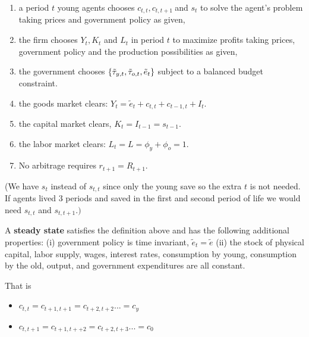 \documentclass{sebase}
\begin{document}
\begin{enumerate}
\item a period $t$ young agents chooses $c_{t,t},c_{t,t+1}\ $and $s_{t}$ to
solve the agent's problem taking prices and government policy as given,

\item the firm chooses $Y_{t},K_{t}$ and $L_{t}$ in period $t$ to maximize
profits taking prices, government policy and the production possibilities as
given,

\item the government chooses $\{\tilde{\tau}_{y,t},\tilde{\tau}_{o,t},\tilde{%
e}_{t}\}$ subject to a balanced budget constraint.

\item the goods market clears: $Y_{t}=\tilde{e}_{t}+c_{t,t}+c_{t-1,t}+I_{t}.$

\item the capital market clears, $K_{t}=I_{t-1}=s_{t-1}.$

\item the labor market clears: $L_{t}=L=\phi _{y}+\phi _{o}=1.$

\item No arbitrage requires $r_{t+1}=R_{t+1}$.\newline
\end{enumerate}

(We have $s_{t}$ instead of $s_{t,t}$ since only the young save so the extra 
$t$ is not needed. If agents lived 3 periods and saved in the first and
second period of life we would need $s_{t,t}$ and $s_{t,t+1}.)$\pagebreak

A \textbf{steady state} satisfies the definition above and has the following
additional properties:\newline
(i) government policy is time invariant, $\tilde{e}_{t}=\tilde{e}$ \newline
(ii) the stock of physical capital, labor supply, wages, interest rates,
consumption by young, consumption by the old, output, and government
expenditures are all constant.

That is

\begin{itemize}
\item $c_{t,t}=c_{t+1,t+1}=c_{t+2,t+2}...=c_{y}$

\item $c_{t,t+1}=c_{t+1,t++2}=c_{t+2,t+3}...=c_{0}$\pagebreak
\end{itemize}
\end{document}
